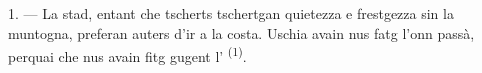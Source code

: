 %
%
%
%
%
%

\VUsaut{4.0mm}
\VUsaut{3.0mm}
\VUsaut{3.0mm}

1. --- La stad, entant che tscherts tschertgan quietezza e frestgezza sin la
muntogna, preferan auters d'ir a la costa. Uschia avain nus fatg l'onn passà,
perquai che nus avain fitg gugent l' \textsuperscript{(1)}.

